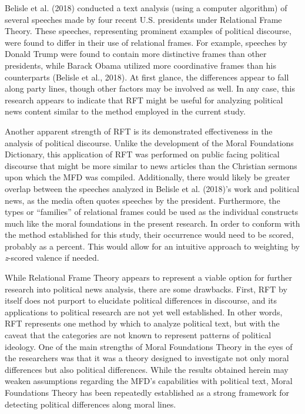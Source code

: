 \documentclass[english,,man]{apa6}
\begin{document}
Belisle et al. (2018) conducted a text analysis (using a computer
algorithm) of several speeches made by four recent U.S. presidents under
Relational Frame Theory. These speeches, representing prominent examples
of political discourse, were found to differ in their use of relational
frames. For example, speeches by Donald Trump were found to contain more
distinctive frames than other presidents, while Barack Obama utilized
more coordinative frames than his counterparts (Belisle et al., 2018).
At first glance, the differences appear to fall along party lines,
though other factors may be involved as well. In any case, this research
appears to indicate that RFT might be useful for analyzing political
news content similar to the method employed in the current study.

Another apparent strength of RFT is its demonstrated effectiveness in
the analysis of political discourse. Unlike the development of the Moral
Foundations Dictionary, this application of RFT was performed on public
facing political discourse that might be more similar to news articles
than the Christian sermons upon which the MFD was compiled.
Additionally, there would likely be greater overlap between the speeches
analyzed in Belisle et al. (2018)'s work and political news, as the
media often quotes speeches by the president. Furthermore, the types or
\enquote{families} of relational frames could be used as the individual
constructs much like the moral foundations in the present research. In
order to conform with the method established for this study, their
occurrence would need to be scored, probably as a percent. This would
allow for an intuitive approach to weighting by \emph{z}-scored valence
if needed.

While Relational Frame Theory appears to represent a viable option for
further research into political news analysis, there are some drawbacks.
First, RFT by itself does not purport to elucidate political differences
in discourse, and its applications to political research are not yet
well established. In other words, RFT represents one method by which to
analyze political text, but with the caveat that the categories are not
known to represent patterns of political ideology. One of the main
strengths of Moral Foundations Theory in the eyes of the researchers was
that it was a theory designed to investigate not only moral differences
but also political differences. While the results obtained herein may
weaken assumptions regarding the MFD's capabilities with political text,
Moral Foundations Theory has been repeatedly established as a strong
framework for detecting political differences along moral lines.
\end{document}
